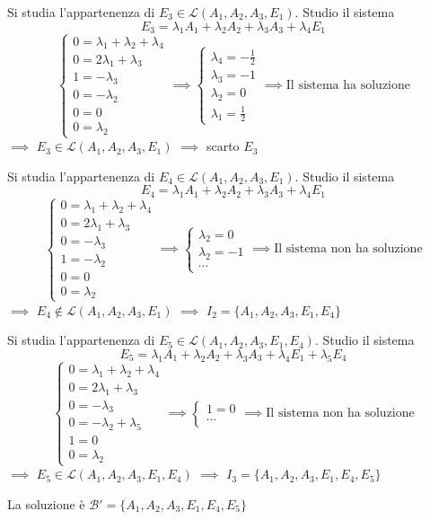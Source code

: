 {Si studia l'appartenenza di $E_3\in\mathscr{L}(A_1, A_2, A_3, E_1)$. Studio il sistema
\[
E_3=\lambda_1 A_1 + \lambda_2 A_2+ \lambda_3A_3+\lambda_4E_1
\]
\[
\begin{cases}
0=\lambda_1+\lambda_2+\lambda_4\\
0=2\lambda_1+\lambda_3\\
1=-\lambda_3\\
0=-\lambda_2\\
0=0\\
0=\lambda_2
\end{cases}\implies \begin{cases}
\lambda_4=-\frac{1}{2}\\
\lambda_3=-1\\
\lambda_2=0\\
\lambda_1=\frac{1}{2}
\end{cases}\implies\text{Il sistema ha soluzione}
\]$\implies$ $E_3\in\mathscr{L}(A_1, A_2, A_3, E_1)$ $\implies$ scarto $E_3$

Si studia l'appartenenza di $E_4\in\mathscr{L}(A_1, A_2, A_3, E_1)$. Studio il sistema
\[
E_4=\lambda_1 A_1 + \lambda_2 A_2+ \lambda_3A_3+\lambda_4 E_1
\]
\[
\begin{cases}
0=\lambda_1+\lambda_2+\lambda_4\\
0=2\lambda_1+\lambda_3\\
0=-\lambda_3\\
1=-\lambda_2\\
0=0\\
0=\lambda_2
\end{cases}\implies \begin{cases}
\lambda_2=0\\
\lambda_2=-1\\
\cdots
\end{cases}\implies\text{Il sistema non ha soluzione}
\]$\implies$ $E_4\notin\mathscr{L}(A_1, A_2, A_3, E_1)$ $\implies$ $I_2=\{A_1, A_2, A_3, E_1, E_4\}$

Si studia l'appartenenza di $E_5\in\mathscr{L}(A_1, A_2, A_3, E_1, E_4)$. Studio il sistema
\[
E_5=\lambda_1 A_1 + \lambda_2 A_2+ \lambda_3A_3+\lambda_4 E_1 +\lambda_5 E_4
\]
\[
\begin{cases}
0=\lambda_1+\lambda_2+\lambda_4\\
0=2\lambda_1+\lambda_3\\
0=-\lambda_3\\
0=-\lambda_2+\lambda_5\\
1=0\\
0=\lambda_2
\end{cases}\implies \begin{cases}
1=0\\
\cdots
\end{cases}\implies\text{Il sistema non ha soluzione}
\]$\implies$ $E_5\in\mathscr{L}(A_1, A_2, A_3, E_1, E_4)$ $\implies$ $I_3=\{A_1, A_2, A_3, E_1, E_4, E_5\}$

La soluzione è $\mathscr{B}'=\{A_1, A_2, A_3, E_1, E_4, E_5\}$
}

